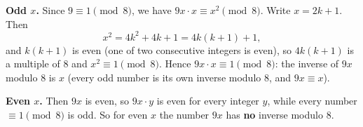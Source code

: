\textbf{Odd $x$.} Since $9\equiv1\pmod8$, we have $9x\cdot x\equiv x^2\pmod 8$. Write $x=2k+1$. Then
\[x^2=4k^2+4k+1=4k(k+1)+1,\]
and $k(k+1)$ is even (one of two consecutive integers is even), so $4k(k+1)$ is a multiple of $8$ and $x^2\equiv1\pmod8$. Hence $9x\cdot x\equiv1\pmod 8$: the inverse of $9x$ modulo $8$ is $x$ (every odd number is its own inverse modulo $8$, and $9x\equiv x$).

\textbf{Even $x$.} Then $9x$ is even, so $9x\cdot y$ is even for every integer $y$, while every number $\equiv1\pmod8$ is odd. So for even $x$ the number $9x$ has \textbf{no} inverse modulo $8$.

